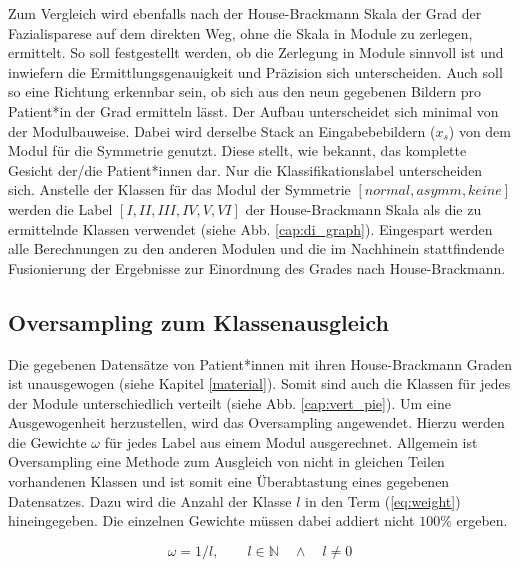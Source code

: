 Zum Vergleich wird ebenfalls nach der House-Brackmann Skala der Grad der Fazialisparese auf dem direkten Weg, ohne die Skala in Module zu zerlegen, ermittelt. So soll festgestellt werden, ob die Zerlegung in Module sinnvoll ist und inwiefern die Ermittlungsgenauigkeit und Präzision sich unterscheiden. Auch soll so eine Richtung erkennbar sein, ob sich aus den neun gegebenen Bildern pro Patient*in der Grad ermitteln lässt. Der Aufbau unterscheidet sich minimal von der Modulbauweise. Dabei wird derselbe Stack an Eingabebebildern ($x_s$) von dem Modul für die Symmetrie genutzt. Diese stellt, wie bekannt, das komplette Gesicht der/die Patient*innen dar. Nur die Klassifikationslabel unterscheiden sich. Anstelle der Klassen für das Modul der Symmetrie $[normal, asymm, keine]$ werden die Label $[I, II, III, IV, V, VI]$ der House-Brackmann Skala als die zu ermittelnde Klassen verwendet (siehe Abb. \ref{cap:di_graph}). Eingespart werden alle Berechnungen zu den anderen Modulen und die im Nachhinein stattfindende Fusionierung der Ergebnisse zur Einordnung des Grades nach House-Brackmann.




\subsection{Oversampling zum Klassenausgleich}\label{oversamplingmethod}

Die gegebenen Datensätze von Patient*innen mit ihren House-Brackmann Graden ist unausgewogen (siehe Kapitel \ref{material}). Somit sind auch die Klassen für jedes der Module unterschiedlich verteilt (siehe Abb. \ref{cap:vert_pie}). Um eine Ausgewogenheit herzustellen, wird das Oversampling angewendet. Hierzu werden die Gewichte $\omega$ für jedes Label aus einem Modul ausgerechnet. Allgemein ist Oversampling eine Methode zum Ausgleich von nicht in gleichen Teilen vorhandenen Klassen und ist somit eine Überabtastung eines gegebenen Datensatzes. Dazu wird die Anzahl der Klasse $l$ in den Term (\ref{eq:weight}) hineingegeben. Die einzelnen Gewichte müssen dabei addiert nicht $100\%$ ergeben.

\begin{equation}
\omega = 1 / l, \qquad l \in \mathbb{N} \quad \land \quad l \neq 0 \label{eq:weight}
\end{equation}

